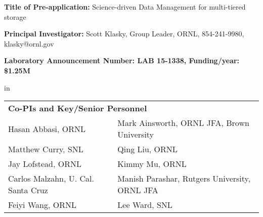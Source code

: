 \documentclass[11pt,letterpaper]{article}
\begin{document}










\setlength{\parindent}{0cm} 
{\bf Title of Pre-application:}  Science-driven Data Management for multi-tiered storage\par
{\bf Principal Investigator:} Scott Klasky, Group Leader, ORNL, 854-241-9980, klasky@ornl.gov \par
{\bf Laboratory Announcement Number: LAB 15-1338, Funding/year: \$1.25M} \par
  in
\hskip -0.08in
\begin{tabular} {ll}
 \multicolumn{2}{l}{\bf Co-PIs and Key/Senior Personnel}\\
Hasan Abbasi, ORNL  & Mark Ainsworth, ORNL JFA, Brown University \\
Matthew Curry, SNL & Qing  Liu, ORNL \\
Jay Lofstead, ORNL & Kimmy Mu, ORNL \\
Carlos Malzahn, U. Cal. Santa Cruz & Manish Parashar, Rutgers University, ORNL JFA \\
Feiyi Wang, ORNL & Lee Ward, SNL
\end{tabular}
\end{document}
